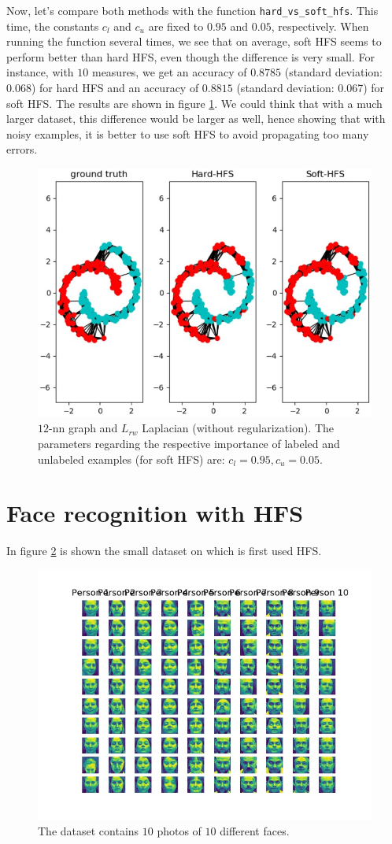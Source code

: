 \documentclass[a4paper, 11pt]{article}
\begin{document}
\begin{enumerate}
	Now, let's compare both methods with the function \texttt{hard\_vs\_soft\_hfs}. This time, the constants $c_l$ and $c_u$ are fixed to $0.95$ and $0.05$, respectively. When running the function several times, we see that on average, soft HFS seems to perform better than hard HFS, even though the difference is very small. For instance, with $10$ measures, we get an accuracy of $0.8785$ (standard deviation: $0.068$) for hard HFS and an accuracy of $0.8815$ (standard deviation: 0.067) for soft HFS. The results are shown in figure \ref{fig:q13-comparison}. We could think that with a much larger dataset, this difference would be larger as well, hence showing that with noisy examples, it is better to use soft HFS to avoid propagating too many errors.
	
	\begin{figure}[!htb]
	    \centering
	    \includegraphics[width=.5\textwidth]{images/q13_comparison.jpg}
	    \caption{$12$-nn graph and $L_{rw}$ Laplacian (without regularization). The parameters regarding the respective importance of labeled and unlabeled examples (for soft HFS) are: $c_l = 0.95, c_u = 0.05$.}
	    \label{fig:q13-comparison}
	\end{figure}
\end{enumerate}

\pagebreak
\section{Face recognition with HFS}

In figure \ref{fig:small-faces-dataset} is shown the small dataset on which is first used HFS.

\begin{figure}[!htb]
    \centering
    \includegraphics[width=.6\textwidth]{images/faces_dataset.jpg}
    \caption{The dataset contains $10$ photos of $10$ different faces.}
    \label{fig:small-faces-dataset}
\end{figure}
\end{document}
